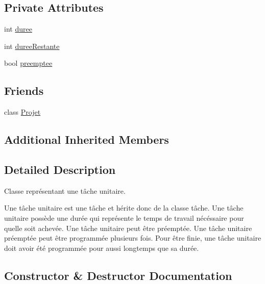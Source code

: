 \subsection*{Private Attributes}
\begin{DoxyCompactItemize}
\item 
int \hyperlink{class_tache_unitaire_a5510c1941069a4391e076ec45e0201fc}{duree}
\item 
int \hyperlink{class_tache_unitaire_a73dd33a7047739e49c80373aeae3158e}{duree\+Restante}
\item 
bool \hyperlink{class_tache_unitaire_a21bc1074f99a80976a52d910e3c21041}{preemptee}
\end{DoxyCompactItemize}
\subsection*{Friends}
\begin{DoxyCompactItemize}
\item 
class \hyperlink{class_tache_unitaire_ab87b41c3faa36955cc370972f5cce344}{Projet}
\end{DoxyCompactItemize}
\subsection*{Additional Inherited Members}


\subsection{Detailed Description}
Classe représentant une tâche unitaire. 

Une tâche unitaire est une tâche et hérite donc de la classe tâche. Une tâche unitaire possède une durée qui représente le temps de travail nécéssaire pour qu\textquotesingle{}elle soit achevée. Une tâche unitaire peut être préemptée. Une tâche unitaire préemptée peut être programmée plusieurs fois. Pour être finie, une tâche unitaire doit avoir été programmée pour aussi longtemps que sa durée. 

\subsection{Constructor \& Destructor Documentation}
\hypertarget{class_tache_unitaire_acca628b1c239bf191fbbf869ad15cdd2}{}
